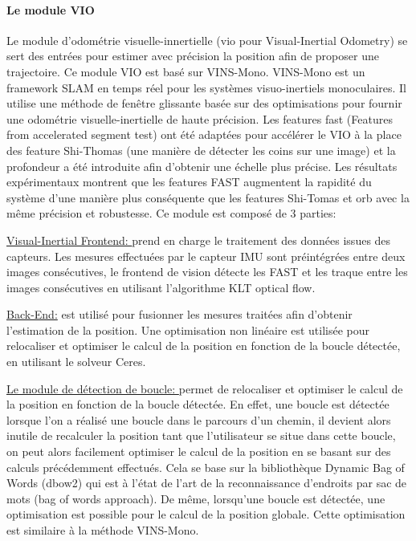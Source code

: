 \documentclass[11pt]{article}
\begin{document}
          \paragraph{Le module VIO}
            Le module d'odométrie visuelle-innertielle (\acrshort{vio} pour Visual-Inertial Odometry) se sert des entrées pour estimer avec précision la position 
            afin de proposer une trajectoire. Ce module VIO est basé sur VINS-Mono. VINS-Mono est un framework SLAM en temps réel pour les 
            systèmes visuo-inertiels monoculaires. Il utilise une méthode de fenêtre glissante basée sur des optimisations pour fournir une odométrie 
            visuelle-inertielle de haute précision.
            Les features \acrshort{fast} (Features from accelerated segment test) ont été adaptées pour accélérer le VIO à 
            la place des feature Shi-Thomas (une manière de détecter les coins sur une image) et la profondeur a été introduite afin d'obtenir une échelle 
            plus précise. Les résultats expérimentaux montrent que les features FAST augmentent la rapidité du système d'une manière plus conséquente 
            que les features Shi-Tomas et \acrshort{orb} avec la même précision et robustesse. Ce module est composé de 3 parties:

          \underline{Visual-Inertial Frontend: }
            prend en charge le traitement des données issues des capteurs. Les mesures effectuées par le capteur IMU
            sont préintégrées entre deux images consécutives, le frontend de vision détecte les FAST
            et les traque entre les images consécutives en utilisant l'algorithme KLT optical flow.

          \underline{Back-End:} est utilisé pour fusionner les mesures traitées afin d'obtenir l'estimation de la position. Une optimisation non linéaire
            est utilisée pour relocaliser et optimiser le calcul de la position en fonction de la boucle détectée, en utilisant le solveur Ceres. 

          \underline{Le module de détection de boucle: } permet de relocaliser et optimiser le calcul de la position en fonction de
            la boucle détectée. En effet, une boucle est détectée lorsque l'on a réalisé une boucle dans le parcours d'un chemin, il devient alors inutile
            de recalculer la position tant que l'utilisateur se situe dans cette boucle, on peut alors facilement optimiser le calcul de la position en se 
            basant sur des calculs précédemment effectués. Cela se base sur la bibliothèque Dynamic Bag of Words (\acrshort{dbow2}) qui est à l'état de l'art de la reconnaissance d'endroits 
            par sac de mots (bag of words approach). De même, lorsqu'une boucle est détectée, une optimisation est possible pour le calcul de la position 
            globale. Cette optimisation est similaire à la méthode VINS-Mono.
\end{document}
